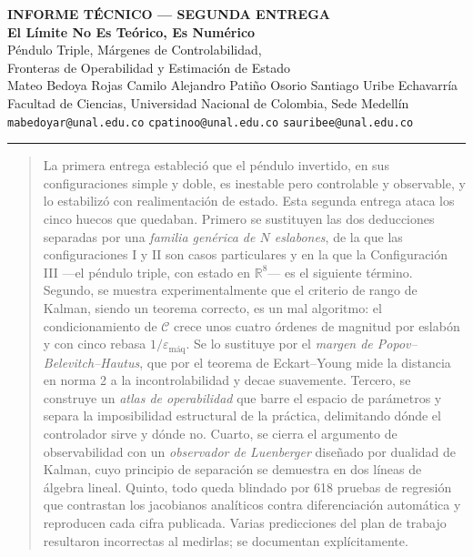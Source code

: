 \documentclass[11pt,letterpaper]{article}
\theoremstyle{definition}
\theoremstyle{plain}
\theoremstyle{remark}
\newcommand{\R}{\mathbb{R}}
\newcommand{\calC}{\mathcal{C}}
\begin{document}
\begin{center}
    {\footnotesize\bfseries\color{acento2} INFORME TÉCNICO --- SEGUNDA ENTREGA}\\[0.4em]
    {\LARGE\bfseries El Límite No Es Teórico, Es Numérico}\\[0.5em]
    {\large Péndulo Triple, Márgenes de Controlabilidad, \\ Fronteras de Operabilidad y Estimación de Estado}\\[1.2em]
    {\normalsize Mateo Bedoya Rojas \quad\textbullet\quad Camilo Alejandro Patiño Osorio \quad\textbullet\quad Santiago Uribe Echavarría}\\[0.5em]
    {\footnotesize
    Facultad de Ciencias, Universidad Nacional de Colombia, Sede Medellín \\ \texttt{mabedoyar@unal.edu.co} \quad \texttt{cpatinoo@unal.edu.co} \quad \texttt{sauribee@unal.edu.co}}\\[0.8em]
\end{center}
\vspace{0.4em}
\hrule height 0.6pt
\vspace{1.0em}

\begin{abstract}
\noindent
La primera entrega estableció que el péndulo invertido, en sus configuraciones
simple y doble, es inestable pero controlable y observable, y lo estabilizó con
realimentación de estado. Esta segunda entrega ataca los cinco huecos que
quedaban. Primero se sustituyen las dos deducciones separadas por una
\emph{familia genérica de $N$ eslabones}, de la que las configuraciones I y II
son casos particulares y en la que la Configuración III ---el péndulo triple,
con estado en $\R^8$--- es el siguiente término. Segundo, se muestra
experimentalmente que el criterio de rango de Kalman, siendo un teorema
correcto, es un mal algoritmo: el condicionamiento de $\calC$ crece unos cuatro
órdenes de magnitud por eslabón y con cinco rebasa $1/\varepsilon_{\text{máq}}$.
Se lo sustituye por el \emph{margen de Popov--Belevitch--Hautus}, que por el
teorema de Eckart--Young mide la distancia en norma 2 a la incontrolabilidad y
decae suavemente. Tercero, se construye un \emph{atlas de operabilidad} que
barre el espacio de parámetros y separa la imposibilidad estructural de la
práctica, delimitando dónde el controlador sirve y dónde no. Cuarto, se cierra
el argumento de observabilidad con un \emph{observador de Luenberger} diseñado
por dualidad de Kalman, cuyo principio de separación se demuestra en dos líneas
de álgebra lineal. Quinto, todo queda blindado por 618 pruebas de regresión que
contrastan los jacobianos analíticos contra diferenciación automática y
reproducen cada cifra publicada. Varias predicciones del plan de trabajo
resultaron incorrectas al medirlas; se documentan explícitamente.
\end{abstract}
\end{document}
